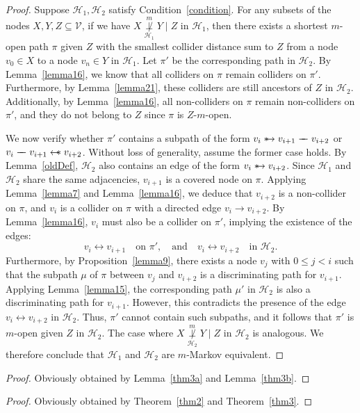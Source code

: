 \documentclass[accepted]{uai2025} %
\newcommand{\huh}{\mathrel{\leftrightarrow}}
\newcommand{\hus}{\mathrel{{\leftarrow\mkern-11mu\ast}}}
\newcommand{\suh}{\mathrel{{\ast\mkern-11mu\to}}}
\newcommand{\tut}{\mathrel{{\relbar\mkern-9mu\relbar}}}
\begin{document}
\thmthreeb*
\begin{proof}
Suppose $\mathcal{H}_1, \mathcal{H}_2$ satisfy Condition~\ref{condition}. For any subsets of the nodes $X, Y, Z \subseteq \mathcal{V}$, if we have $X \overset{m}{\underset{\mathcal{H}_1}{\not\perp}} Y \mid Z$ in $\mathcal{H}_1$, then there exists a shortest $m$-open path $\pi$ given $Z$ with the smallest collider distance sum to $Z$ from a node $v_0 \in X$ to a node $v_n \in Y$ in $\mathcal{H}_1$. Let $\pi'$ be the corresponding path in $\mathcal{H}_2$. By Lemma~\ref{lemma16}, we know that all colliders on $\pi$ remain colliders on $\pi'$. Furthermore, by Lemma~\ref{lemma21}, these colliders are still ancestors of $Z$ in $\mathcal{H}_2$. Additionally, by Lemma~\ref{lemma16}, all non-colliders on $\pi$ remain non-colliders on $\pi'$, and they do not belong to $Z$ since $\pi$ is $Z$-$m$-open. 

We now verify whether $\pi'$ contains a subpath of the form \( v_i \suh v_{i+1} \tut v_{i+2} \) or \( v_i \tut v_{i+1} \hus v_{i+2} \). Without loss of generality, assume the former case holds. By Lemma~\ref{oldDef}, $\mathcal{H}_2$ also contains an edge of the form $v_i \suh v_{i+2}$. Since $\mathcal{H}_1$ and $\mathcal{H}_2$ share the same adjacencies, $v_{i+1}$ is a covered node on $\pi$. Applying Lemma~\ref{lemma7} and Lemma~\ref{lemma16}, we deduce that $v_{i+2}$ is a non-collider on $\pi$, and $v_i$ is a collider on $\pi$ with a directed edge $v_i \rightarrow v_{i+2}$. By Lemma~\ref{lemma16}, $v_i$ must also be a collider on $\pi'$, implying the existence of the edges:
\[
v_i \huh v_{i+1} \quad \text{on } \pi', \quad \text{and} \quad v_i \huh v_{i+2} \quad \text{in } \mathcal{H}_2.
\]
Furthermore, by Proposition~\ref{lemma9}, there exists a node $v_j$ with $0 \leq j < i$ such that the subpath $\mu$ of $\pi$ between $v_j$ and $v_{i+2}$ is a discriminating path for $v_{i+1}$. Applying Lemma~\ref{lemma15}, the corresponding path $\mu'$ in $\mathcal{H}_2$ is also a discriminating path for $v_{i+1}$. However, this contradicts the presence of the edge $v_i \huh  v_{i+2}$ in $\mathcal{H}_2$. Thus, $\pi'$ cannot contain such subpaths, and it follows that $\pi'$ is $m$-open given $Z$ in $\mathcal{H}_2$. The case where \( X \overset{m}{\underset{\mathcal{H}_2}{\not\perp}} Y \mid Z \) in $\mathcal{H}_2$ is analogous. We therefore conclude that $\mathcal{H}_1$ and $\mathcal{H}_2$ are $m$-Markov equivalent.
\end{proof}






\thmthree*
\begin{proof}
Obviously obtained by Lemma~\ref{thm3a} and Lemma~\ref{thm3b}.
\end{proof}






\thmfour*
\begin{proof}
Obviously obtained by Theorem~\ref{thm2} and Theorem~\ref{thm3}.
\end{proof}
\end{document}
